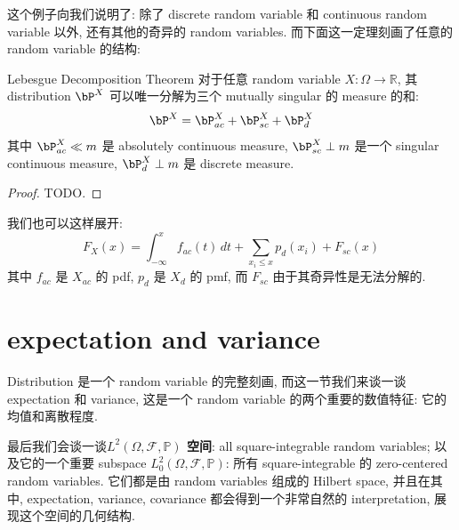 
这个例子向我们说明了: 除了 discrete random variable 和 continuous random variable 以外, 
还有其他的奇异的 random variables. 而下面这一定理刻画了任意的 random variable 的结构:

\begin{theorem}{Lebesgue Decomposition Theorem}
    对于任意 random variable \(X: \Omega \to \mathbb{R}\), 
    其 distribution \(\bP^X\) 可以唯一分解为三个 mutually singular 的 measure 的和:
    \[
    \bP^X = \bP^X_{ac} + \bP^X_{sc} + \bP^X_{d}
    \]
    其中 \(\bP^X_{ac} \ll m\) 是 absolutely continuous measure, 
    \(\bP^X_{sc} \perp m\) 是一个 singular continuous measure, 
    \(\bP^X_d \perp m\) 是 discrete measure.
\end{theorem}
\begin{proof}
    TODO.
\end{proof}
\begin{remark}
    我们也可以这样展开:
    $$ F_X(x) = \int_{-\infty}^x f_{ac}(t) \, dt + \sum_{x_i \le x} p_{d}(x_i) + F_{sc}(x) $$
其中 \(f_{ac}\) 是 \(X_{ac}\) 的 pdf, \(p_d\) 是 \(X_d\) 的 pmf, 而 \(F_{sc}\) 由于其奇异性是无法分解的.
\end{remark}


\section{expectation and variance}
Distribution 是一个 random variable 的完整刻画, 而这一节我们来谈一谈 expectation 
和 variance, 这是一个 random variable 的两个重要的数值特征: 它的均值和离散程度.

最后我们会谈一谈\textbf{$L^2(\Omega, \mathcal{F}, \mathbb{P})$ 空间}: 
 all square-integrable random variables; 以及它的一个重要 subspace 
$L_0^2(\Omega, \mathcal{F}, \mathbb{P})$: 
所有 square-integrable 的 zero-centered random variables. 
它们都是由 random variables 组成的 Hilbert space, 并且在其中, 
expectation, variance, covariance 都会得到一个非常自然的 interpretation, 
展现这个空间的几何结构.


